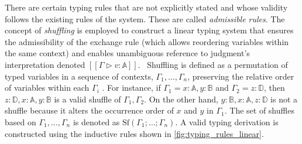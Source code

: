 There are certain typing rules that are not explicitly stated and whose validity follows the existing rules of the system. These are called \emph{admissible rules}.
The concept of \emph{shuffling} is employed to construct a linear typing system that ensures the admissibility of the exchange rule (which allows reordering variables within the same context) and enables unambiguous reference to judgment's interpretation denoted $[\![ \Gamma \triangleright v: \mathbb{A} ]\!]$.  Shuffling is defined as a permutation of typed variables in a sequence of contexts, $\Gamma_1, \ldots, \Gamma_n$, preserving the relative order of variables within each $\Gamma_i$ \cite{shulman2019practical}. For instance, if $\Gamma_1=x:\mathbb{A}, y:\mathbb{B}$ and $\Gamma_2=z:\mathbb{D}$, then $z:\mathbb{D}, x:\mathbb{A}, y:\mathbb{B}$ is a valid shuffle of $\Gamma_1, \Gamma_2$. On the other hand, $y:\mathbb{B}, x:\mathbb{A}, z:\mathbb{D}$ is not a shuffle because it alters the occurrence order of $x$ and $y$ in $\Gamma_1$. The set of shuffles based on $\Gamma_1, \ldots, \Gamma_n$ is denoted as $\text{Sf} (\Gamma_1; \ldots; \Gamma_n)$. A valid typing derivation is constructed using the inductive rules shown in \autoref{fig:typing_rules_linear}.
